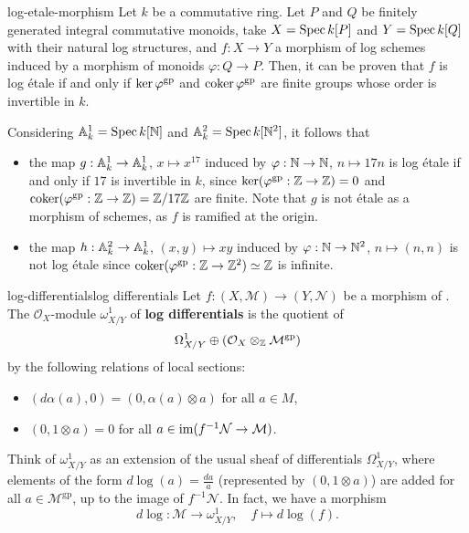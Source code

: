 \begin{example}{log-etale-morphism}
    Let $k$ be a commutative ring. Let $P$ and $Q$ be finitely generated integral commutative monoids, take $X = \Spec k[P]$ and $Y = \Spec k[Q]$ with their natural log structures, and $f : X \to Y$ a morphism of log schemes induced by a morphism of monoids $\varphi : Q \to P$. Then, it can be proven that $f$ is log étale if and only if $\ker \varphi^\textup{gp}$ and $\coker \varphi^\textup{gp}$ are finite groups whose order is invertible in $k$.
    
    Considering $\AA^1_k = \Spec k[\NN]$ and $\AA^2_k = \Spec k[\NN^2]$, it follows that
    \begin{itemize}
        \item the map $g : \AA^1_k \to \AA^1_k$, $x \mapsto x^{17}$ induced by $\varphi : \NN \to \NN$, $n \mapsto 17n$ is log étale if and only if $17$ is invertible in $k$, since $\ker(\varphi^\textup{gp} : \ZZ \to \ZZ) = 0$ and $\coker(\varphi^\textup{gp} : \ZZ \to \ZZ) = \ZZ / 17 \ZZ$ are finite. Note that $g$ is not étale as a morphism of schemes, as $f$ is ramified at the origin.
        \item the map $h : \AA^2_k \to \AA^1_k$, $(x, y) \mapsto xy$ induced by $\varphi : \NN \to \NN^2$, $n \mapsto (n, n)$ is not log étale since $\coker(\varphi^\textup{gp} : \ZZ \to \ZZ^2) \simeq \ZZ$ is infinite.
    \end{itemize}
\end{example}

\begin{topic}{log-differentials}{log differentials}
    Let $f : (X, \mathcal{M}) \to (Y, \mathcal{N})$ be a morphism of . The $\mathcal{O}_X$-module $\omega^1_{X/Y}$ of \textbf{log differentials} is the quotient of
    \[ \Omega_{X/Y}^1 \oplus (\mathcal{O}_X \otimes_\ZZ \mathcal{M}^\text{gp}) \]
    by the following relations of local sections:
    \begin{itemize}
        \item $(d \alpha(a), 0) = (0, \alpha(a) \otimes a)$ for all $a \in M$,
        \item $(0, 1 \otimes a) = 0$ for all $a \in \im(f^{-1} \mathcal{N} \to \mathcal{M})$.
    \end{itemize}
    
    Think of $\omega^1_{X/Y}$ as an extension of the usual sheaf of differentials $\Omega_{X/Y}^1$, where elements of the form $d \log(a) = \frac{da}{a}$ (represented by $(0, 1 \otimes a)$) are added for all $a \in \mathcal{M}^\text{gp}$, up to the image of $f^{-1} \mathcal{N}$. In fact, we have a morphism
    \[ d \log : \mathcal{M} \to \omega_{X/Y}^1, \quad f \mapsto d \log(f) . \]
\end{topic}

